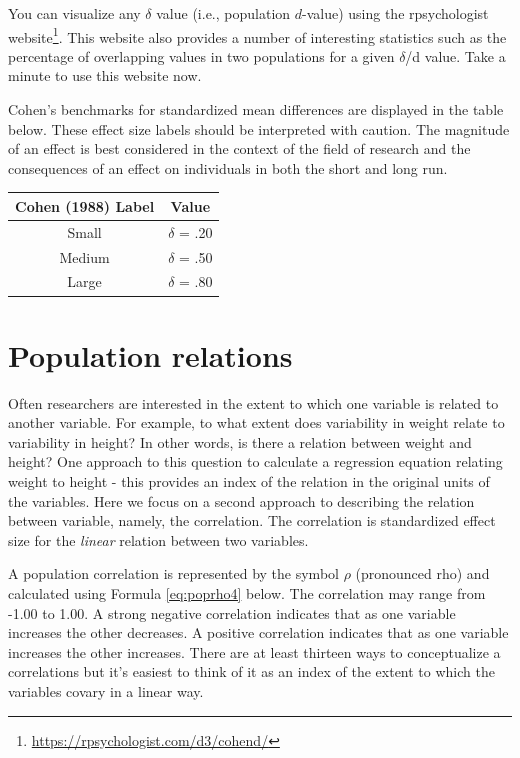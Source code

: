 \documentclass[
]{krantz}
\renewcommand{\href}[2]{#2\footnote{\url{#1}}}
\begin{document}
You can visualize any \(\delta\) value (i.e., population \(d\)-value) using the rpsychologist \href{https://rpsychologist.com/d3/cohend/}{website}. This website also provides a number of interesting statistics such as the percentage of overlapping values in two populations for a given \(\delta\)/d value. Take a minute to use this website now.

Cohen's benchmarks for standardized mean differences are displayed in the table below. These effect size labels should be interpreted with caution. The magnitude of an effect is best considered in the context of the field of research and the consequences of an effect on individuals in both the short and long run.

\begin{longtable}[]{@{}cc@{}}
\toprule
Cohen (1988) Label & Value\tabularnewline
\midrule
\endhead
Small & \(\delta\) = .20\tabularnewline
Medium & \(\delta\) = .50\tabularnewline
Large & \(\delta\) = .80\tabularnewline
\bottomrule
\end{longtable}

\hypertarget{population-relations}{%
\section{Population relations}\label{population-relations}}

Often researchers are interested in the extent to which one variable is related to another variable. For example, to what extent does variability in weight relate to variability in height? In other words, is there a relation between weight and height? One approach to this question to calculate a regression equation relating weight to height - this provides an index of the relation in the original units of the variables. Here we focus on a second approach to describing the relation between variable, namely, the correlation. The correlation is standardized effect size for the \emph{linear} relation between two variables.

A population correlation is represented by the symbol \(\rho\) (pronounced rho) and calculated using Formula \eqref{eq:poprho4} below. The correlation may range from -1.00 to 1.00. A strong negative correlation indicates that as one variable increases the other decreases. A positive correlation indicates that as one variable increases the other increases. There are at least thirteen ways to conceptualize a correlations \citep[see][]{lee1988thirteen} but it's easiest to think of it as an index of the extent to which the variables covary in a linear way.
\end{document}
